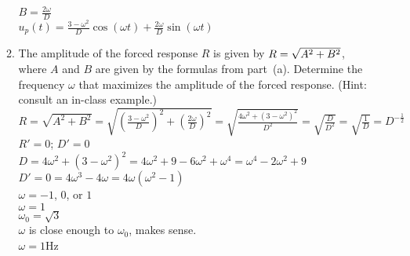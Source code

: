 \documentclass{article}
\begin{document}
\begin{enumerate}
\begin{enumerate}
\\$B=\frac{2\omega}{D}$
\\$u_p(t)=\frac{3-\omega^2}{D}\cos(\omega t)+\frac{2\omega}{D}\sin(\omega t)$
\item The amplitude of the forced response $R$ is given by $R=\sqrt{A\sp2+B\sp2}$, where $A$ and $B$ are given by the formulas from part~(a).  Determine the frequency $\omega$ that maximizes the amplitude of the forced response.  (Hint: consult an in-class example.)
\\$R=\sqrt{A^2+B^2}=\sqrt{(\frac{3-\omega^2}{D})^2+(\frac{2\omega}{D})^2}=\sqrt{\frac{4\omega^2+(3-\omega^2)^2}{D^2}}=\sqrt{\frac{D}{D^2}}=\sqrt{\frac{1}{D}}=D^{-\frac{1}{2}}$
\\$R'=0$; $D'=0$
\\$D=4\omega^2+(3-\omega^2)^2=4\omega^2+9-6\omega^2+\omega^4=\omega^4-2\omega^2+9$
\\$D'=0=4\omega^3-4\omega=4\omega(\omega^2-1)$
\\$\omega=-1$, $0$, or $1$
\\$\omega=1$
\\$\omega_0=\sqrt{3}$
\\$\omega$ is close enough to $\omega_0$, makes sense.
\\$\omega=1$Hz
\end{enumerate}


\end{enumerate}
\end{document}
